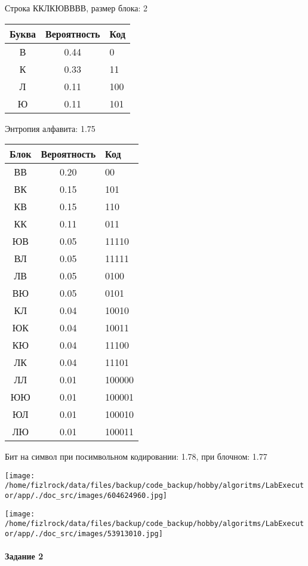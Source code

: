 \documentclass[a4paper, 12pt]{article}
\begin{document}
Строка ККЛКЮВВВВ, размер блока: 2
\begin{center}
 \begin{tabular}{ |c|c|l| } 
  \hline
     Буква & Вероятность & Код\\ \hline
В & 0.44 & 0\\\hline
К & 0.33 & 11\\\hline
Л & 0.11 & 100\\\hline
Ю & 0.11 & 101
\\ \hline \end{tabular}
\end{center}
Энтропия алфавита: 1.75
\begin{center}
 \begin{tabular}{ |c|c|l| } 
  \hline
     Блок & Вероятность & Код\\ \hline
ВВ & 0.20 & 00\\\hline
ВК & 0.15 & 101\\\hline
КВ & 0.15 & 110\\\hline
КК & 0.11 & 011\\\hline
ЮВ & 0.05 & 11110\\\hline
ВЛ & 0.05 & 11111\\\hline
ЛВ & 0.05 & 0100\\\hline
ВЮ & 0.05 & 0101\\\hline
КЛ & 0.04 & 10010\\\hline
ЮК & 0.04 & 10011\\\hline
КЮ & 0.04 & 11100\\\hline
ЛК & 0.04 & 11101\\\hline
ЛЛ & 0.01 & 100000\\\hline
ЮЮ & 0.01 & 100001\\\hline
ЮЛ & 0.01 & 100010\\\hline
ЛЮ & 0.01 & 100011
\\ \hline \end{tabular}
\end{center}
Бит на символ при посимвольном кодировании: 1.78, при блочном: 1.77

\texttt{[image: /home/fizlrock/data/files/backup/code\_backup/hobby/algoritms/LabExecutor/app/./doc\_src/images/604624960.jpg]}

\texttt{[image: /home/fizlrock/data/files/backup/code\_backup/hobby/algoritms/LabExecutor/app/./doc\_src/images/53913010.jpg]}
\pagebreak
\paragraph{Задание 2}
\end{document}
